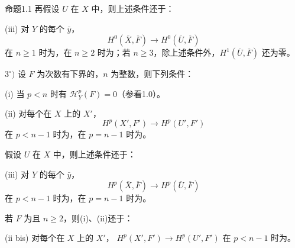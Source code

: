 \begin{SGAresult}{命题}{1.1}
再假设 $U$ 在 $X$ 中，则上述条件还于：

(iii) 对 $Y$ 的每个 $\bar y$，
\[H^0(\overline X,\overline F)\longrightarrow H^0(\overline U,\overline F)\]
在 $n\geq1$ 时为，在 $n\geq2$ 时为；若 $n\geq3$，除上述条件外，$H^1(\overline U,\overline F)$ 还为零。

$3^\circ)$ 设 $F$ 为次数有下界的，$n$ 为整数，则下列条件：

(i) 当 $p<n$ 时有 $\mathcal H_Y^p(F)=0$（参看1.0）。

(ii) 对每个在 $X$ 上的 $X'$，
\[H^p(X',F')\longrightarrow H^p(U',F')\]
在 $p<n-1$ 时为，在 $p=n-1$ 时为。

假设 $U$ 在 $X$ 中，则上述条件还于：

(iii) 对 $Y$ 的每个 $\bar y$，
\[H^p(\overline X,\overline F)\longrightarrow H^p(\overline U,\overline F)\]
在 $p<n-1$ 时为，在 $p=n-1$ 时为。

若 $F$ 为且 $n\geq2$，则(i)、(ii)还于：

(ii bis) 对每个在 $X$ 上的 $X'$， $H^p(X',F')\to H^p(U',F')$ 在 $p<n-1$ 时为。
\end{SGAresult}
